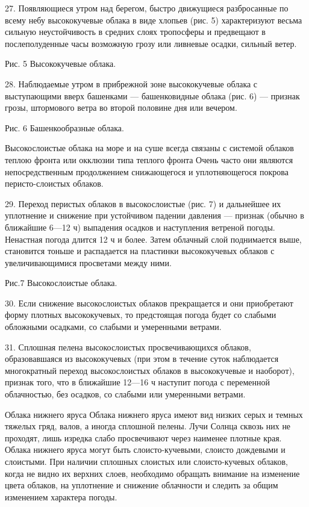27. Появляющиеся утром над берегом, быстро движущиеся разбросанные по всему небу высококучевые облака в виде хлопьев (рис. 5) характеризуют весьма сильную неустойчивость в средних слоях тропосферы и предвещают в послеполуденные часы возможную грозу или ливневые осадки, сильный ветер.


Рис. 5 Высококучевые облака.

28. Наблюдаемые утром в прибрежной зоне высококучевые облака с выступающими вверх башенками — башенковидные облака (рис. 6) — признак грозы, штормового ветра во второй половине дня или вечером.


Рис. 6 Башенкообразные облака.

Высокослоистые облака на море и на суше всегда связаны с системой облаков теплою фронта или окклюзии типа теплого фронта Очень часто они являются непосредственным продолжением снижающегося и уплотняющегося покрова перисто-слоистых облаков.

29. Переход перистых облаков в высокослоистые (рис. 7) и дальнейшее их уплотнение и снижение при устойчивом падении давления — признак (обычно в ближайшие 6—12 ч) выпадения осадков и наступления ветреной погоды. Ненастная погода длится 12 ч и более. Затем облачный слой поднимается выше, становится тоньше и распадается на пластинки высококучевых облаков с увеличивающимися просветами между ними.


Рис.7 Высокослоистые облака.

30. Если снижение высокослоистых облаков прекращается и они приобретают форму плотных высококучевых, то предстоящая погода будет со слабыми обложными осадками, со слабыми и умеренными ветрами.

31. Сплошная пелена высокослоистых просвечивающихся облаков, образовавшаяся из высококучевых (при этом в течение суток наблюдается многократный переход высокослоистых облаков в высококучевые и наоборот), признак того, что в ближайшие 12—16 ч наступит погода с переменной облачностью, без осадков, со слабыми или умеренными ветрами.

Облака нижнего яруса
Облака нижнего яруса имеют вид низких серых и темных тяжелых гряд, валов, а иногда сплошной пелены. Лучи Солнца сквозь них не проходят, лишь изредка слабо просвечивают через наименее плотные края. Облака нижнего яруса могут быть слоисто-кучевыми, слоисто дождевыми и слоистыми. При наличии сплошных слоистых или слоисто-кучевых облаков, когда не видно их верхних слоев, необходимо обращать внимание на изменение цвета облаков, на уплотнение и снижение облачности и следить за общим изменением характера погоды.

